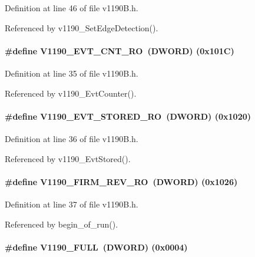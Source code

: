 Definition at line 46 of file v1190B.h.

Referenced by v1190\_\-SetEdgeDetection().
\paragraph[{V1190\_\-EVT\_\-CNT\_\-RO}]{\setlength{\rightskip}{0pt plus 5cm}\#define V1190\_\-EVT\_\-CNT\_\-RO~({\bf DWORD}) (0x101C)}\hfill\label{v1190B_8h_ad8f5664e82e318d2586d22a5f3c3d07e}


Definition at line 35 of file v1190B.h.

Referenced by v1190\_\-EvtCounter().
\paragraph[{V1190\_\-EVT\_\-STORED\_\-RO}]{\setlength{\rightskip}{0pt plus 5cm}\#define V1190\_\-EVT\_\-STORED\_\-RO~({\bf DWORD}) (0x1020)}\hfill\label{v1190B_8h_ad5d499f434d8126411bb7f34958da307}


Definition at line 36 of file v1190B.h.

Referenced by v1190\_\-EvtStored().
\paragraph[{V1190\_\-FIRM\_\-REV\_\-RO}]{\setlength{\rightskip}{0pt plus 5cm}\#define V1190\_\-FIRM\_\-REV\_\-RO~({\bf DWORD}) (0x1026)}\hfill\label{v1190B_8h_aa40d97048826c28a4f94b4bd676bbbea}


Definition at line 37 of file v1190B.h.

Referenced by begin\_\-of\_\-run().
\paragraph[{V1190\_\-FULL}]{\setlength{\rightskip}{0pt plus 5cm}\#define V1190\_\-FULL~({\bf DWORD}) (0x0004)}\hfill\label{v1190B_8h_af2620afa3a14851575a6598176a7defe}


